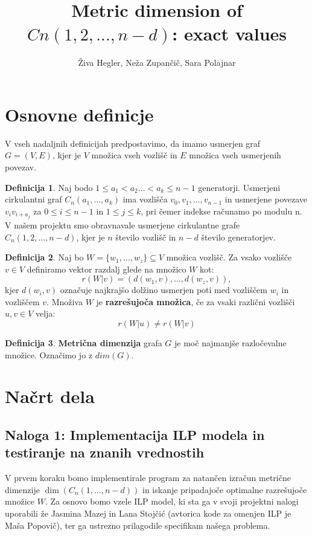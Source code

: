 \documentclass[a4paper,12pt]{article}
\title{Metric dimension of $Cn(1, 2, . . . , n - d)$: exact values}
\author{Živa Hegler, Neža Zupančič, Sara Polajnar}
\theoremstyle{definition}
\newtheorem{definicija}{Definicija}
\begin{document}
\maketitle

\section{Osnovne definicje}
V vseh nadaljnih definicijah predpostavimo, da imamo usmerjen graf
$G = (V, E)$, kjer je $V$ množica vseh vozlišč in $E$ množica vseh usmerjenih povezav. 
\begin{definicija}
    Naj bodo $1 \leq a_1 < a_2 \ldots < a_k \leq n-1$ generatorji.
    Usmerjeni cirkulantni graf $C_n(a_1, \ldots, a_{k})$ ima vozlišča
    $v_0, v_1, \ldots, v_{n-1}$ in usmerjene povezave $v_iv_{i+a_j}$ za  
    $0 \leq i \leq n-1$ in $1 \leq j \leq k$, pri čemer indekse računamo
    po modulu n. V našem projektu smo obravnavale usmerjene cirkulantne grafe 
    $C_n(1,2,\ldots,n-d)$, kjer je $n$ število vozlišč in $n-d$ število generatorjev.
\end{definicija}

\begin{definicija}
    Naj bo $W = \{w_1, \ldots, w_z\} \subseteq V$ množica vozlišč.
    Za vsako vozlišče $v \in V$ definiramo vektor razdalj glede na
    množico $W$ kot:
    $$
    r(W|v) = (d(w_1, v), \ldots, d(w_z, v)),
    $$
    kjer $d(w_i, v)$ označuje najkrajšo dolžino usmerjen poti med
    vozliščem $w_i$ in vozliščem $v$. Množiva $W$ je \textbf{razrešujoča množica},
    če za vsaki različni vozlišči $u, v \in V$ velja:
    $$
    r(W|u) \neq r(W|v)
    $$
\end{definicija}

\begin{definicija}
    \textbf{Metrična dimenzija} grafa $G$ je moč najmanjše razločevalne
    množice. Označimo jo z $dim(G).$
\end{definicija}


\section{Načrt dela}
\subsection{Naloga 1: Implementacija ILP modela in testiranje na znanih vrednostih}

V prvem koraku bomo implementirale program za natančen izračun metrične dimenzije
$\operatorname{dim}(C_n(1, \dots, n-d))$ in iskanje pripadajoče optimalne razrešujoče množice $W$. 
Za osnovo bomo vzele ILP model, ki sta ga v svoji projektni nalogi uporabili že Jasmina Mazej in Lana Stojčić (avtorica 
kode za omenjen ILP je Maša Popovič), ter ga ustrezno prilagodile specifikam našega problema.
\end{document}
